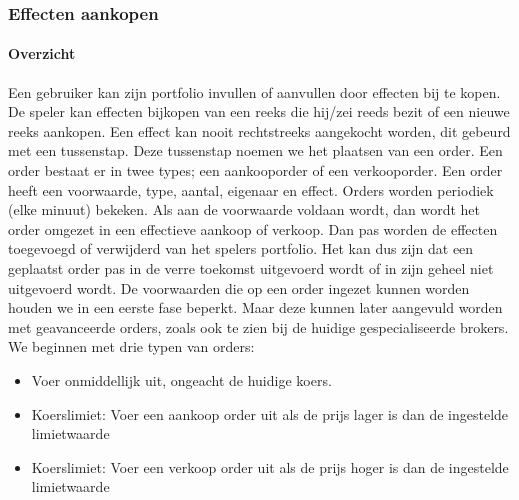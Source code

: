 \subsubsection{Effecten aankopen}

\paragraph{Overzicht}Een gebruiker kan zijn portfolio invullen of aanvullen door effecten bij te kopen. De speler kan effecten bijkopen van een reeks die hij/zei reeds bezit of een nieuwe reeks aankopen. Een effect kan nooit rechtstreeks aangekocht worden, dit gebeurd met een tussenstap. Deze tussenstap noemen we het plaatsen van een order. Een order bestaat er in twee types; een aankooporder of een verkooporder. Een order heeft een voorwaarde, type, aantal, eigenaar en effect. Orders worden periodiek (elke minuut) bekeken. Als aan de voorwaarde voldaan wordt, dan wordt het order omgezet in een effectieve aankoop of verkoop. Dan pas worden de effecten toegevoegd of verwijderd van het spelers portfolio. Het kan dus zijn dat een geplaatst order pas in de verre toekomst uitgevoerd wordt of in zijn geheel niet uitgevoerd wordt. De voorwaarden die op een order ingezet kunnen worden houden we in een eerste fase beperkt. Maar deze kunnen later aangevuld worden met geavanceerde orders, zoals ook te zien bij de huidige gespecialiseerde brokers. We beginnen met drie typen van orders:

\begin{itemize}
 \item Voer onmiddellijk uit, ongeacht de huidige koers.
 \item Koerslimiet: Voer een aankoop order uit als de prijs lager is dan de ingestelde limietwaarde
 \item Koerslimiet: Voer een verkoop order uit als de prijs hoger is dan de ingestelde limietwaarde
\end{itemize}


